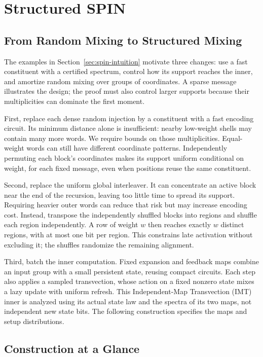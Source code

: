 \section{Structured SPIN}
\label{sec:structured-spin}

\subsection{From Random Mixing to Structured Mixing}

The examples in Section~\ref{sec:spin-intuition} motivate three changes:
use a fast constituent with a certified spectrum, control how its support
reaches the inner, and amortize random mixing over groups of coordinates.
A sparse message illustrates the design; the proof must also control
larger supports because their multiplicities can dominate the first moment.

First, replace each dense random injection by a constituent with a fast
encoding circuit. Its minimum distance alone is insufficient: nearby
low-weight shells may contain many more words. We require bounds on those
multiplicities. Equal-weight words can still have different coordinate
patterns. Independently permuting each block's coordinates makes
its support uniform conditional on weight, for each fixed message, even
when positions reuse the same constituent.

Second, replace the uniform global interleaver. It can concentrate an
active block near the end of the recursion, leaving too little time to
spread its support. Requiring heavier outer words can reduce that risk
but may increase encoding cost. Instead, transpose the independently
shuffled blocks into regions and shuffle each region independently.
A row of weight $w$ then reaches exactly $w$ distinct regions, with at
most one bit per region. This constrains late activation without
excluding it; the shuffles randomize the remaining alignment.

Third, batch the inner computation. Fixed expansion and feedback maps
combine an input group with a small persistent state, reusing compact
circuits. Each step also applies a sampled transvection, whose action on
a fixed nonzero state mixes a lazy update with uniform refresh.
This Independent-Map Transvection (IMT) inner is analyzed using its actual
state law and the spectra of its two maps, not independent new state bits.
The following construction specifies the maps and setup distributions.

\subsection{Construction at a Glance}

